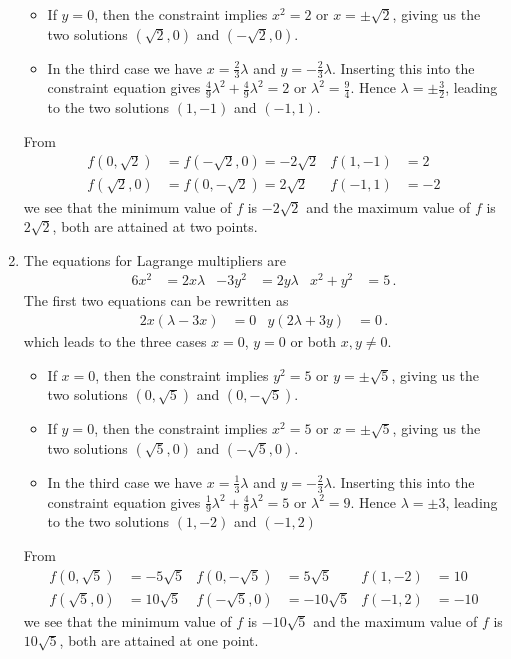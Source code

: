 \begin{solution}
\begin{enumerate}
\begin{itemize}
\item
If $y=0$, then the constraint implies $x^2 = 2$ or $x = \pm \sqrt{2}$, giving us the two solutions $(\sqrt{2},0)$ and $(-\sqrt{2},0)$.

\item
In the third case we have $x=\frac 23 \lambda$ and $y=-\frac 23 \lambda$. Inserting this into the constraint equation gives $\frac 49 \lambda^2 + \frac 49 \lambda^2 = 2$ or $\lambda^2 = \frac 94$. Hence $\lambda = \pm \frac 32$, leading to the two solutions $(1,-1)$ and $(-1, 1)$.
\end{itemize}

From
\begin{align*}
f(0,\sqrt{2}) &= f(-\sqrt{2}, 0) = -2\sqrt{2} & f(1,-1) &= 2 \\
f(\sqrt{2}, 0) &= f(0,-\sqrt{2}) = 2\sqrt{2} & f(-1,1) &= -2
\end{align*}
we see that the minimum value of $f$ is $-2\sqrt{2}$ and the maximum value of $f$ is $2\sqrt{2}$, both are attained at two points.

\item
The equations for Lagrange multipliers are
\begin{align*}
6x^2 &= 2x \lambda &
-3y^2 &= 2y\lambda &
x^2 + y^2 &= 5 \,.
\end{align*}
The first two equations can be rewritten as
\begin{align*}
2x(\lambda-3x) &= 0 &
y(2\lambda+3y) &= 0\,.
\end{align*}
which leads to the three cases $x=0$, $y=0$ or both $x,y \neq 0$.

\begin{itemize}
\item
If $x=0$, then the constraint implies $y^2 = 5$ or $y = \pm \sqrt{5}$, giving us the two solutions $(0,\sqrt{5})$ and $(0,-\sqrt{5})$.

\item
If $y=0$, then the constraint implies $x^2 = 5$ or $x = \pm \sqrt{5}$, giving us the two solutions $(\sqrt{5},0)$ and $(-\sqrt{5},0)$.

\item
In the third case we have $x=\frac 13 \lambda$ and $y=-\frac 23 \lambda$. Inserting this into the constraint equation gives $\frac 19 \lambda^2 + \frac 49 \lambda^2 = 5$ or $\lambda^2 = 9$. Hence $\lambda = \pm 3$, leading to the two solutions $(1,-2)$ and $(-1, 2)$
\end{itemize}

From
\begin{align*}
f(0,\sqrt{5}) &= -5\sqrt{5} & f(0,-\sqrt{5}) &= 5\sqrt{5} & f(1,-2) &= 10 \\
f(\sqrt{5}, 0) &= 10\sqrt{5} & f(-\sqrt{5},0) &= -10\sqrt{5} & f(-1,2) &= -10
\end{align*}
we see that the minimum value of $f$ is $-10\sqrt{5}$ and the maximum value of $f$ is $10\sqrt{5}$, both are attained at one point.


\end{enumerate}
\end{solution}
